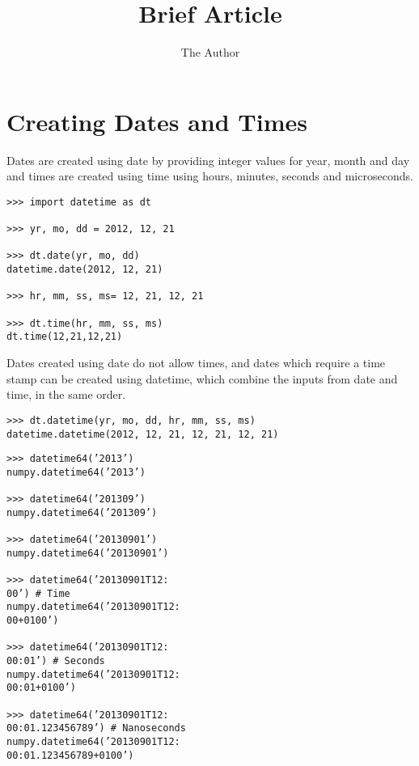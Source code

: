 \documentclass[11pt]{article} %
\title{Brief Article}
\author{The Author}
\begin{document}
\section{Creating Dates and Times}

Dates are created using date by providing integer values for year, month and day and times are created
using time using hours, minutes, seconds and microseconds.

\begin{framed}
\begin{verbatim}
>>> import datetime as dt

>>> yr, mo, dd = 2012, 12, 21

>>> dt.date(yr, mo, dd)
datetime.date(2012, 12, 21)

>>> hr, mm, ss, ms= 12, 21, 12, 21

>>> dt.time(hr, mm, ss, ms)
dt.time(12,21,12,21)

\end{verbatim}
\end{framed}

Dates created using date do not allow times, and dates which require a time stamp can be created using
datetime, which combine the inputs from date and time, in the same order.
\begin{framed}
\begin{verbatim}
>>> dt.datetime(yr, mo, dd, hr, mm, ss, ms)
datetime.datetime(2012, 12, 21, 12, 21, 12, 21)

\end{verbatim}
\end{framed}


\begin{verbatim}
>>> datetime64(’2013’)
numpy.datetime64(’2013’)

>>> datetime64(’201309’)
numpy.datetime64(’201309’)

>>> datetime64(’20130901’)
numpy.datetime64(’20130901’)

>>> datetime64(’20130901T12:
00’) # Time
numpy.datetime64(’20130901T12:
00+0100’)

>>> datetime64(’20130901T12:
00:01’) # Seconds
numpy.datetime64(’20130901T12:
00:01+0100’)

>>> datetime64(’20130901T12:
00:01.123456789’) # Nanoseconds
numpy.datetime64(’20130901T12:
00:01.123456789+0100’)
\end{verbatim}
\end{document}

